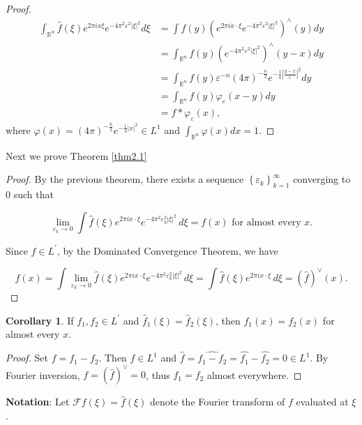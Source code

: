 \documentclass[12pt,openany]{book}
\theoremstyle{definition}
\newtheorem{corollary}[theorem]{Corollary}
\begin{document}
\begin{proof}
    $$
\begin{aligned}
\int_{\mathbb{R}^n}\hat{f}(\xi) e^{2 \pi i x \xi} e^{-4 \pi^2 \varepsilon^2|\xi|^2} d\xi &= \int f(y) \left(e^{2 \pi i x \cdot \xi} e^{-4 \pi^2 \varepsilon^2|\xi|^2}\right)^{\wedge}(y) dy \\
&= \int_{\mathbb{R}^n} f(y) \left(e^{-4 \pi^2 \varepsilon^2|\xi|^2}\right)^{\wedge}(y-x) dy \\
&= \int_{\mathbb{R}^n} f(y) \varepsilon^{-n}(4 \pi)^{-\frac{n}{2}} e^{-\frac{1}{4}\left|\frac{y-x}{\varepsilon}\right|^2} dy \\
&= \int_{\mathbb{R}^n} f(y) \varphi_{\varepsilon}(x-y) dy \\
&= f * \varphi_{\varepsilon}(x),
\end{aligned}
$$
where $\varphi(x) = (4 \pi)^{-\frac{n}{2}} e^{-\frac{1}{4}|x|^2} \in L^1$ and $\int_{\mathbb{R}^n}\varphi(x) dx= 1$.
\end{proof}
Next we prove Theorem \ref{thm2.1}
\begin{proof}
    By the previous theorem, there exists a sequence $\left\{{\varepsilon_k}\right\}_{k=1}^{\infty}$ converging to 0 such that

$$\lim_{{\varepsilon_k \rightarrow 0}} \int \hat{f}(\xi) e^{2 \pi i x \cdot \xi} e^{-4 \pi^2 \varepsilon_k^2|\xi|^2} \, d\xi = f(x) \text{ for almost every } x.$$

Since $\hat{f} \in L^{\prime}$, by the Dominated Convergence Theorem, we have

$$f(x) = \int \lim_{{\varepsilon_k \rightarrow 0}} \hat{f}(\xi) e^{2 \pi i x \cdot \xi} e^{-4 \pi^2 \varepsilon_k^2|\xi|^2} \, d\xi = \int \hat{f}(\xi) e^{2 \pi i x \cdot \xi} \, d\xi = (\hat{f})^{\vee}(x).$$
\end{proof}
\begin{corollary}
    If $f_1, f_2 \in L^{\prime}$ and $\hat{f}_1(\xi) = \hat{f}_2(\xi)$, then $f_1(x) = f_2(x)$ for almost every $x$.

\end{corollary}
\begin{proof}
    Set $f = f_1 - f_2$. Then $f \in L^1$ and $\hat{f} = \widehat{f_1 - f_2} = \hat{f_1} - \hat{f_2} = 0 \in L^1$.
By Fourier inversion, $f = (\hat{f})^{\vee} = 0$, thus $f_1 = f_2$ almost everywhere.
\end{proof}
\noindent\textbf{Notation}: Let $\mathcal{F}f(\xi) = \hat{f}(\xi)$ denote the Fourier transform of $f$ evaluated at $\xi$.
\end{document}
